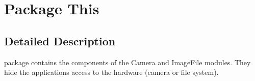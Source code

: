 \hypertarget{namespace_this}{}\section{Package This}
\label{namespace_this}


\subsection{Detailed Description}
package contains the components of the Camera and Image\+File modules. They hide the applications access to the hardware (camera or file system). 